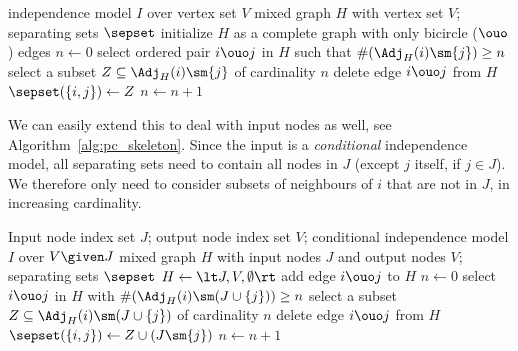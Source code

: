 \begin{algorithm}
  \begin{algorithmic}[1]
  \Input independence model $I$ over vertex set $V$
  \Output mixed graph $H$ with vertex set $V$; separating sets $\sepset$
  \State initialize $H$ as a complete graph with only bicircle ($\ouo$) edges
  \State $n \leftarrow 0$
    \Repeat
    \Repeat
    \State select ordered pair $i \ouo j$ in $H$ such that $\#(\Adj_H(i)\sm\{j\}) \ge n$
    \State select a subset $Z \subseteq \Adj_H(i)\sm\{j\}$ of cardinality $n$
      \State delete edge $i \ouo j$ from $H$
      \State $\sepset(\{i,j\}) \leftarrow Z$
    \EndIf
    \State $n \leftarrow n + 1$
  \end{algorithmic}
  \caption{PC skeleton algorithm $\mathtt{PCskeleton}(V,I)$. \label{alg:pc_skeleton}}
\end{algorithm}

We can easily extend this to deal with input nodes as well, see Algorithm~\ref{alg:pc_skeleton}.
Since the input is a \emph{conditional} independence model, all separating sets need to contain all nodes in $J$ (except $j$ itself, if $j \in J$).
We therefore only need to consider subsets of neighbours of $i$ that are not in $J$, in increasing cardinality.

\begin{algorithm}
  \begin{algorithmic}[1]
  \Input Input node index set $J$; output node index set $V$; conditional independence model $I$ over $V \given J$
  \Output mixed graph $H$ with input nodes $J$ and output nodes $V$; separating sets $\sepset$
  \State $H \leftarrow \lt J, V, \emptyset \rt$
    \State add edge $i \ouo j$ to $H$
  \EndFor
  \State $n \leftarrow 0$
    \Repeat
    \Repeat
    \State select $i \ouo j$ in $H$ with $\#(\Adj_H(i)\sm(J\cup\{j\})) \ge n$
    \State select a subset $Z \subseteq \Adj_H(i)\sm(J\cup\{j\})$ of cardinality $n$
      \State delete edge $i \ouo j$ from $H$
      \State $\sepset(\{i,j\}) \leftarrow Z \cup (J \sm \{j\})$
    \EndIf
    \State $n \leftarrow n + 1$
  \end{algorithmic}
  \caption{Conditional PC skeleton algorithm $\mathtt{CPCskeleton}(J,V,I)$.\label{alg:pc_skeleton}}
\end{algorithm}

